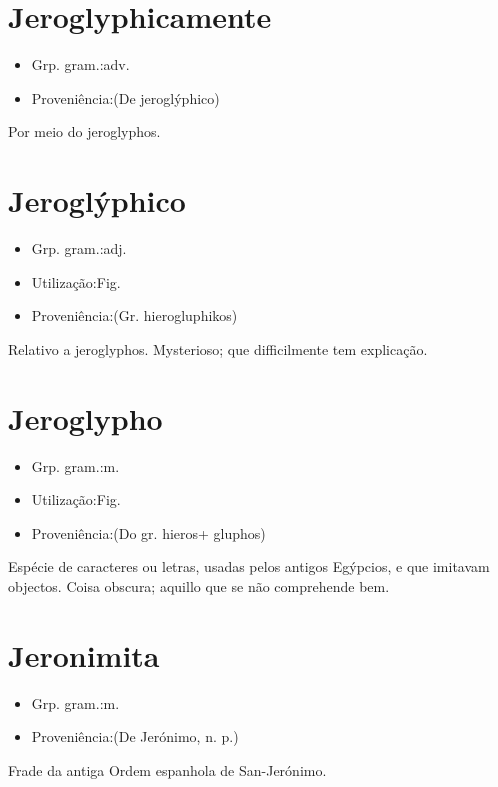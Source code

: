 \documentclass{article}
\begin{document}
\section{Jeroglyphicamente}
\begin{itemize}
\item {Grp. gram.:adv.}
\end{itemize}
\begin{itemize}
\item {Proveniência:(De \textunderscore jeroglýphico\textunderscore )}
\end{itemize}
Por meio do jeroglyphos.
\section{Jeroglýphico}
\begin{itemize}
\item {Grp. gram.:adj.}
\end{itemize}
\begin{itemize}
\item {Utilização:Fig.}
\end{itemize}
\begin{itemize}
\item {Proveniência:(Gr. \textunderscore hierogluphikos\textunderscore )}
\end{itemize}
Relativo a jeroglyphos.
Mysterioso; que difficilmente tem explicação.
\section{Jeroglypho}
\begin{itemize}
\item {Grp. gram.:m.}
\end{itemize}
\begin{itemize}
\item {Utilização:Fig.}
\end{itemize}
\begin{itemize}
\item {Proveniência:(Do gr. \textunderscore hieros\textunderscore  + \textunderscore gluphos\textunderscore )}
\end{itemize}
Espécie de caracteres ou letras, usadas pelos antigos Egýpcios, e que imitavam objectos.
Coisa obscura; aquillo que se não comprehende bem.
\section{Jeronimita}
\begin{itemize}
\item {Grp. gram.:m.}
\end{itemize}
\begin{itemize}
\item {Proveniência:(De \textunderscore Jerónimo\textunderscore , n. p.)}
\end{itemize}
Frade da antiga Ordem espanhola de San-Jerónimo.
\end{document}
